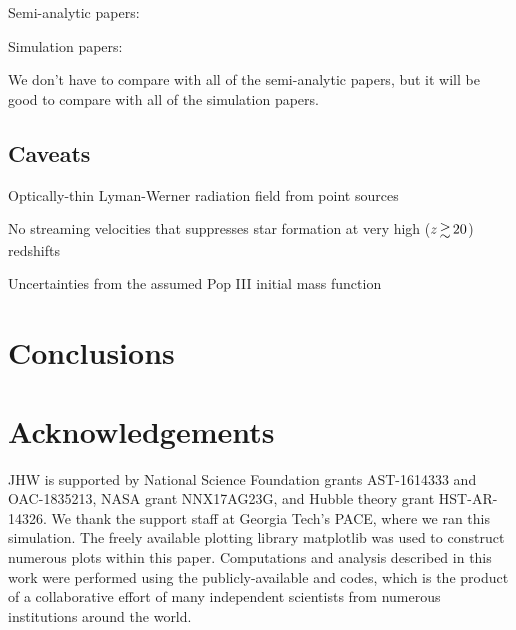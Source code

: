 \documentclass[a4paper,fleqn,usenatbib]{mnras}
\begin{document}
\li Semi-analytic papers: \citep{Tegmark97, Trenti09, Visbal18,
  Mebane18, Griffen18}

\li Simulation papers: \citep{Machacek01, Yoshida03, Wise07_UVB,
  OShea08, Muratov13}

\li We don't have to compare with all of the semi-analytic papers, but
it will be good to compare with all of the simulation papers.

\subsection{Caveats}

\li Optically-thin Lyman-Werner radiation field from point sources \citep{Schauer17}

\li No streaming velocities that suppresses star formation at very
high ($z \ga 20$) redshifts \citep{Tselia11, Greif11_Delay, Naoz12, OLeary12}

\li Uncertainties from the assumed Pop III initial mass function 

\section{Conclusions}

\section*{Acknowledgements}

JHW is supported by National Science Foundation grants AST-1614333 and
OAC-1835213, NASA grant NNX17AG23G, and Hubble theory grant
HST-AR-14326.  We thank the support staff at Georgia Tech's PACE,
where we ran this simulation.  The freely available plotting library
{\sc matplotlib} \citep{matplotlib} was used to construct numerous
plots within this paper. Computations and analysis described in this
work were performed using the publicly-available \enzo{} and \yt{}
codes, which is the product of a collaborative effort of many
independent scientists from numerous institutions around the world.

\end{document}
